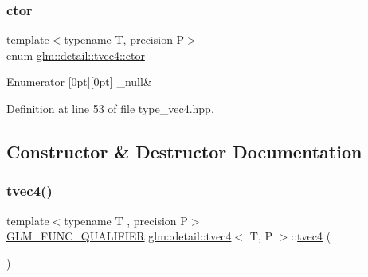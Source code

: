 \subsubsection{\texorpdfstring{ctor}{ctor}}
{\footnotesize\ttfamily template$<$typename T, precision P$>$ \\
enum \hyperlink{structglm_1_1detail_1_1tvec4_a931ed25f812335023097a513240ae102}{glm\+::detail\+::tvec4\+::ctor}}

\begin{DoxyEnumFields}{Enumerator}
[0pt][0pt]{}\mbox{\label{structglm_1_1detail_1_1tvec4_a931ed25f812335023097a513240ae102a3dbae54a695116b6fb8635a42fbf83f8}} 
\+\_\+null&\\
\hline

\end{DoxyEnumFields}


Definition at line 53 of file type\+\_\+vec4.\+hpp.



\subsection{Constructor \& Destructor Documentation}
\mbox{\label{structglm_1_1detail_1_1tvec4_ada663df3fdced3212e73be30374bf5cc}} 
\subsubsection{\texorpdfstring{tvec4()}{tvec4()}\hspace{0.1cm}{\footnotesize\ttfamily [1/23]}}
{\footnotesize\ttfamily template$<$typename T , precision P$>$ \\
\hyperlink{setup_8hpp_a33fdea6f91c5f834105f7415e2a64407}{G\+L\+M\+\_\+\+F\+U\+N\+C\+\_\+\+Q\+U\+A\+L\+I\+F\+I\+ER} \hyperlink{structglm_1_1detail_1_1tvec4}{glm\+::detail\+::tvec4}$<$ T, P $>$\+::\hyperlink{structglm_1_1detail_1_1tvec4}{tvec4} (\begin{DoxyParamCaption}{ }\end{DoxyParamCaption})}



